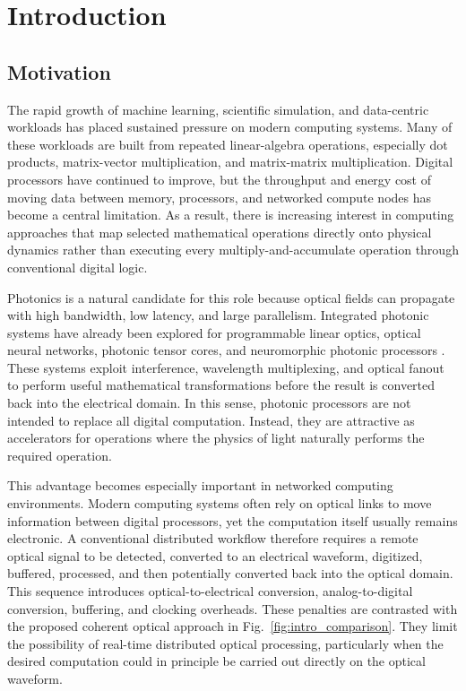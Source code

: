 \chapter{Introduction}

\section{Motivation}

The rapid growth of machine learning, scientific simulation, and data-centric workloads has placed sustained pressure on modern computing systems. Many of these workloads are built from repeated linear-algebra operations, especially dot products, matrix-vector multiplication, and matrix-matrix multiplication. Digital processors have continued to improve, but the throughput and energy cost of moving data between memory, processors, and networked compute nodes has become a central limitation. As a result, there is increasing interest in computing approaches that map selected mathematical operations directly onto physical dynamics rather than executing every multiply-and-accumulate operation through conventional digital logic.

Photonics is a natural candidate for this role because optical fields can propagate with high bandwidth, low latency, and large parallelism. Integrated photonic systems have already been explored for programmable linear optics, optical neural networks, photonic tensor cores, and neuromorphic photonic processors \cite{bogaerts2020programmable,shen2017deep,feldmann2021parallel,tait2017neuromorphic,hamerly2019large}. These systems exploit interference, wavelength multiplexing, and optical fanout to perform useful mathematical transformations before the result is converted back into the electrical domain. In this sense, photonic processors are not intended to replace all digital computation. Instead, they are attractive as accelerators for operations where the physics of light naturally performs the required operation.

This advantage becomes especially important in networked computing environments. Modern computing systems often rely on optical links to move information between digital processors, yet the computation itself usually remains electronic. A conventional distributed workflow therefore requires a remote optical signal to be detected, converted to an electrical waveform, digitized, buffered, processed, and then potentially converted back into the optical domain. This sequence introduces optical-to-electrical conversion, analog-to-digital conversion, buffering, and clocking overheads. These penalties are contrasted with the proposed coherent optical approach in Fig.~\ref{fig:intro_comparison}. They limit the possibility of real-time distributed optical processing, particularly when the desired computation could in principle be carried out directly on the optical waveform.

